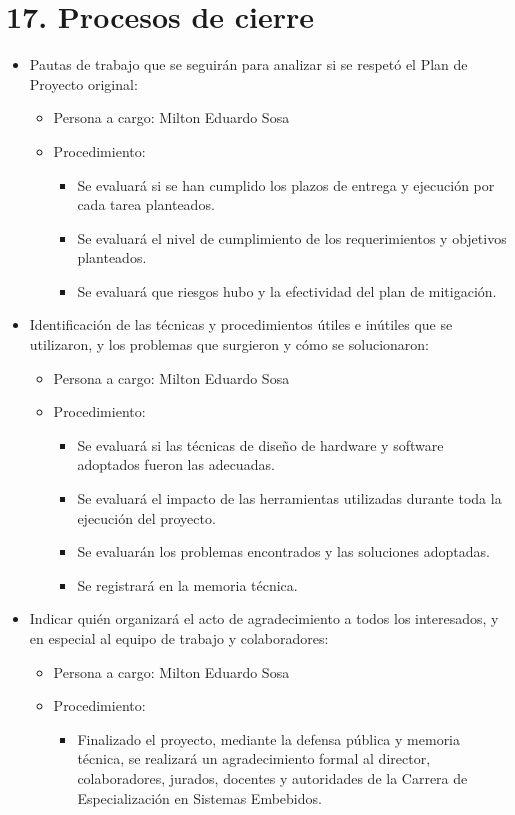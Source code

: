 \documentclass[11pt]{charter}
\begin{document}
\section{17. Procesos de cierre}    
\label{sec:cierre}
\begin{itemize}
	\item Pautas de trabajo que se seguirán para analizar si se respetó el Plan de Proyecto original:
	\begin{itemize}
		\item Persona a cargo: Milton Eduardo Sosa
		\item Procedimiento:
		\begin{itemize}
			\item Se evaluará si se han cumplido los plazos de entrega y ejecución por cada tarea planteados.
			\item Se evaluará el nivel de cumplimiento de los requerimientos y objetivos planteados.
			\item Se evaluará que riesgos hubo y la efectividad del plan de mitigación.
		\end{itemize}
	\end{itemize}

	\item Identificación de las técnicas y procedimientos útiles e inútiles que se utilizaron, y los problemas que surgieron y cómo se solucionaron:
	\begin{itemize}
		\item Persona a cargo: Milton Eduardo Sosa
		\item Procedimiento:
		\begin{itemize}
			\item Se evaluará si las técnicas de diseño de hardware y software adoptados fueron las adecuadas.
			\item Se evaluará el impacto de las herramientas utilizadas durante toda la ejecución del proyecto.
			\item Se evaluarán los problemas encontrados y las soluciones adoptadas.
			\item Se registrará en la memoria técnica.
		\end{itemize}
	\end{itemize}

	\item Indicar quién organizará el acto de agradecimiento a todos los interesados, y en especial al equipo de trabajo y colaboradores:
	\begin{itemize}
		\item Persona a cargo: Milton Eduardo Sosa
		\item Procedimiento:
		\begin{itemize}
			\item Finalizado el proyecto, mediante la defensa pública y memoria técnica, se realizará un agradecimiento formal al director, colaboradores, jurados, docentes y autoridades de la Carrera de Especialización en Sistemas Embebidos.
		\end{itemize}
	\end{itemize}	
\end{itemize}
\end{document}
